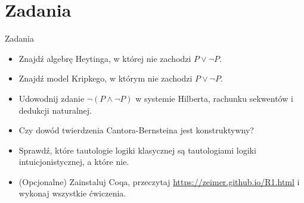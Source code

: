 \documentclass{beamer}
\begin{document}
\section{Zadania}

\begin{frame}{Zadania}
\begin{itemize}
	\item Znajdź algebrę Heytinga, w której nie zachodzi $P \lor \neg P$.
	\item Znajdź model Kripkego, w którym nie zachodzi $P \lor \neg P$.
	\item Udowodnij zdanie $\neg (P \land \neg P)$ w systemie Hilberta, rachunku sekwentów i dedukcji naturalnej.
	\item Czy dowód twierdzenia Cantora-Bernsteina jest konstruktywny?
	\item Sprawdź, które tautologie logiki klasycznej są tautologiami logiki intuicjonistycznej, a które nie.
	\item (Opcjonalne) Zainstaluj Coqa, przeczytaj \url{https://zeimer.github.io/R1.html} i wykonaj wszystkie ćwiczenia.
\end{itemize}
\end{frame}
\end{document}
